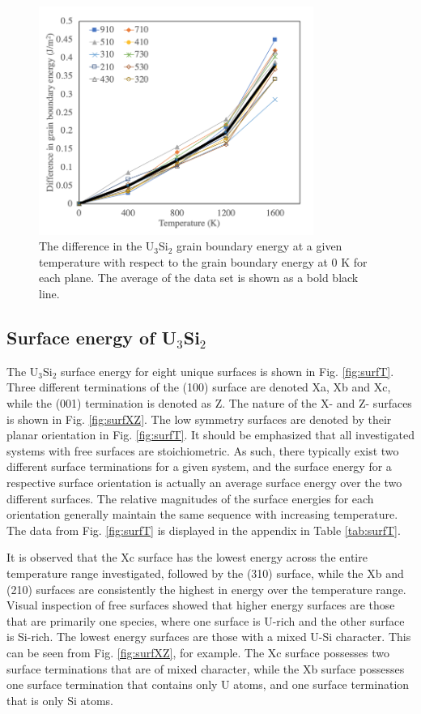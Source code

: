 \documentclass[review]{elsarticle}
\begin{document}
 \begin{figure}[h]
 \centering
 \includegraphics[width=0.8\textwidth]{deltaGB_vs_T.png} 
 \caption{The difference in the U$_{3}$Si$_{2}$ grain boundary energy at a given temperature with respect to the grain boundary energy at 0 K for each plane. The average of the data set is shown as a bold black line. }
 \label{fig:gbdeltaT}
\end{figure}

\FloatBarrier

\subsection{Surface energy of U$_{3}$Si$_{2}$}

The U$_{3}$Si$_{2}$ surface energy for eight unique surfaces is shown in Fig. \ref{fig:surfT}. Three different terminations of the (100) surface are denoted Xa, Xb and Xc, while the (001) termination is denoted as Z. The nature of the X- and Z- surfaces is shown in Fig. \ref{fig:surfXZ}. The low symmetry surfaces are denoted by their planar orientation in Fig. \ref{fig:surfT}. It should be emphasized that all investigated systems with free surfaces are stoichiometric. As such, there typically exist two different surface terminations for a given system, and the surface energy for a respective surface orientation is actually an average surface energy over the two different surfaces. The relative magnitudes of the surface energies for each orientation generally maintain the same sequence with increasing temperature. The data from Fig. \ref{fig:surfT} is displayed in the appendix in Table \ref{tab:surfT}.

It is observed that the Xc surface has the lowest energy across the entire temperature range investigated, followed by the (310) surface, while the Xb and (210) surfaces are consistently the highest in energy over the temperature range. Visual inspection of free surfaces showed that higher energy surfaces are those that are primarily one species, where one surface is U-rich and the other surface is Si-rich. The lowest energy surfaces are those with a mixed U-Si character. This can be seen from Fig. \ref{fig:surfXZ}, for example. The Xc surface possesses two surface terminations that are of mixed character, while the Xb surface possesses one surface termination that contains only U atoms, and one surface termination that is only Si atoms. 
\end{document}
